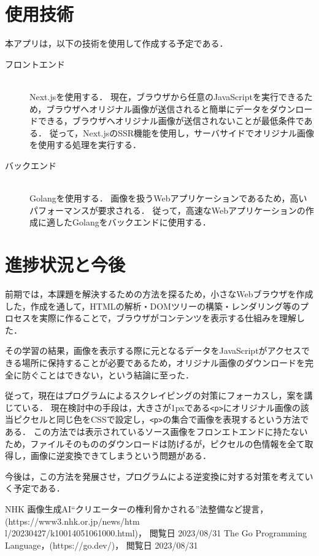 ﻿\documentclass[twocolumn,a4j]{jarticle}
\begin{document}
\section{使用技術}
本アプリは，以下の技術を使用して作成する予定である．
\begin{description}
  \item[フロントエンド]\mbox{}\\
  \quad Next.jsを使用する．
  現在，ブラウザから任意のJavaScriptを実行できるため，ブラウザへオリジナル画像が送信されると簡単にデータをダウンロードできる，ブラウザへオリジナル画像が送信されないことが最低条件である．
  従って，Next.jsのSSR機能を使用し，サーバサイドでオリジナル画像を使用する処理を実行する．
  \item[バックエンド]\mbox{}\\
  \quad Golangを使用する．
  画像を扱うWebアプリケーションであるため，高いパフォーマンスが要求される．
  従って，高速なWebアプリケーションの作成に適したGolangをバックエンドに使用する\cite{go}．
\end{description}


\section{進捗状況と今後}
前期では，本課題を解決するための方法を探るため，小さなWebブラウザを作成した，作成を通して，HTMLの解析・DOMツリーの構築・レンダリング等のプロセスを実際に作ることで，ブラウザがコンテンツを表示する仕組みを理解した．\par
その学習の結果，画像を表示する際に元となるデータをJavaScriptがアクセスできる場所に保持することが必要であるため，オリジナル画像のダウンロードを完全に防ぐことはできない，という結論に至った．\par
従って，現在はプログラムによるスクレイピングの対策にフォーカスし，案を講じている．
現在検討中の手段は，大きさが1pxである\lstinline!<p>!にオリジナル画像の該当ピクセルと同じ色をCSSで設定し，\lstinline|<p>|の集合で画像を表現するという方法である．
この方法では表示されているソース画像をフロンエトエンドに持たないため，ファイルそのもののダウンロードは防げるが，ピクセルの色情報を全て取得し，画像に逆変換できてしまうという問題がある．\par
今後は，この方法を発展させ，プログラムによる逆変換に対する対策を考えていく予定である．


\begin{thebibliography}{9}\setlength{\itemsep}{-2pt}
   NHK 画像生成AI“クリエーターの権利脅かされる”法整備など提言，(https://www3.nhk.or.jp/news/htm\\l/20230427/k10014051061000.html)， 閲覧日 2023/08/31
   The Go Programming Language，(https://go.dev/)， 閲覧日 2023/08/31
\end{thebibliography}
\end{document}

